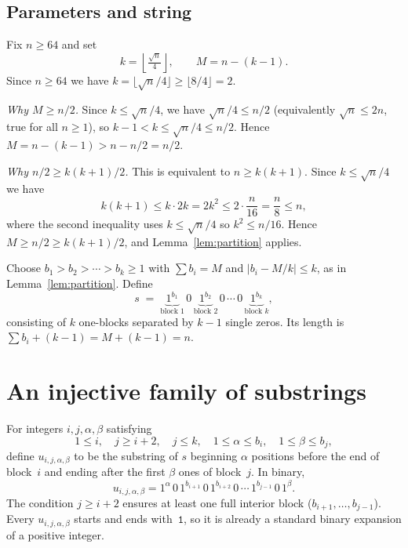 ﻿\documentclass[11pt,a4paper]{article}
\theoremstyle{plain}
\theoremstyle{definition}
\theoremstyle{remark}
\newcommand{\floor}[1]{\left\lfloor #1 \right\rfloor}
\begin{document}
\subsection{Parameters and string}

Fix $n\ge64$ and set
\begin{equation}\label{eq:params}
  k=\floor{\tfrac{\sqrt{n}}{4}},\qquad M=n-(k-1).
\end{equation}
Since $n\ge64$ we have $k=\lfloor\sqrt{n}/4\rfloor\ge\lfloor8/4\rfloor=2$.

\textit{Why $M\ge n/2$.}
Since $k\le\sqrt{n}/4$, we have $\sqrt{n}/4\le n/2$ (equivalently $\sqrt{n}\le2n$, true for all $n\ge1$),
so $k-1<k\le\sqrt{n}/4\le n/2$.
Hence $M=n-(k-1)>n-n/2=n/2$.

\textit{Why $n/2\ge k(k+1)/2$.}
This is equivalent to $n\ge k(k+1)$.  Since $k\le\sqrt{n}/4$ we have
\[
  k(k+1)\le k\cdot2k=2k^2\le2\cdot\frac{n}{16}=\frac{n}{8}\le n,
\]
where the second inequality uses $k\le\sqrt{n}/4$ so $k^2\le n/16$.
Hence $M\ge n/2\ge k(k+1)/2$, and Lemma~\ref{lem:partition} applies.

Choose $b_1>b_2>\cdots>b_k\ge1$ with $\sum b_i=M$ and
$|b_i-M/k|\le k$, as in Lemma~\ref{lem:partition}.  Define
\begin{equation}\label{eq:string}
  s\;=\;\underbrace{1^{b_1}}_{\text{block }1}\,0\,
         \underbrace{1^{b_2}}_{\text{block }2}\,0\,
         \cdots\,0\,
         \underbrace{1^{b_k}}_{\text{block }k},
\end{equation}
consisting of $k$ one-blocks separated by $k-1$ single zeros.  Its
length is $\sum b_i+(k-1)=M+(k-1)=n$.

\section{An injective family of substrings}\label{sec:family}

For integers $i,j,\alpha,\beta$ satisfying
\begin{equation}\label{eq:range}
  1\le i,\quad j\ge i+2,\quad j\le k,\quad
  1\le\alpha\le b_i,\quad 1\le\beta\le b_j,
\end{equation}
define $u_{i,j,\alpha,\beta}$ to be the substring of $s$ beginning
$\alpha$ positions before the end of block~$i$ and ending after the
first $\beta$ ones of block~$j$.  In binary,
\begin{equation}\label{eq:u}
  u_{i,j,\alpha,\beta}
  =1^{\alpha}\,0\,1^{b_{i+1}}\,0\,1^{b_{i+2}}\,0\,
  \cdots\,1^{b_{j-1}}\,0\,1^{\beta}.
\end{equation}
The condition $j\ge i+2$ ensures at least one full interior block
($b_{i+1},\ldots,b_{j-1}$).  Every $u_{i,j,\alpha,\beta}$ starts and
ends with~$\mathtt{1}$, so it is already a standard binary expansion of
a positive integer.
\end{document}
